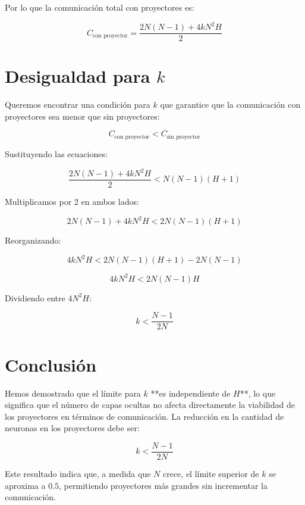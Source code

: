 \documentclass{article}
\begin{document}
Por lo que la comunicación total con proyectores es:

\begin{equation}
C_{\text{con proyector}} = \frac{2N(N-1) + 4kN^2 H}{2}
\end{equation}

\section{Desigualdad para \( k \)}

Queremos encontrar una condición para \( k \) que garantice que la comunicación con proyectores sea menor que sin proyectores:

\begin{equation}
C_{\text{con proyector}} < C_{\text{sin proyector}}
\end{equation}

Sustituyendo las ecuaciones:

\begin{equation}
\frac{2N(N-1) + 4kN^2 H}{2} < N(N-1)(H+1)
\end{equation}

Multiplicamos por 2 en ambos lados:

\begin{equation}
2N(N-1) + 4kN^2 H < 2N(N-1)(H+1)
\end{equation}

Reorganizando:

\begin{equation}
4kN^2 H < 2N(N-1)(H+1) - 2N(N-1)
\end{equation}

\begin{equation}
4kN^2 H < 2N(N-1)H
\end{equation}

Dividiendo entre \( 4N^2 H \):

\begin{equation}
k < \frac{N-1}{2N}
\end{equation}

\section{Conclusión}

Hemos demostrado que el límite para \( k \) **es independiente de \( H \)**, lo que significa que el número de capas ocultas no afecta directamente la viabilidad de los proyectores en términos de comunicación. La reducción en la cantidad de neuronas en los proyectores debe ser:

\begin{equation}
k < \frac{N-1}{2N}
\end{equation}

Este resultado indica que, a medida que \( N \) crece, el límite superior de \( k \) se aproxima a \( 0.5 \), permitiendo proyectores más grandes sin incrementar la comunicación.
\end{document}
